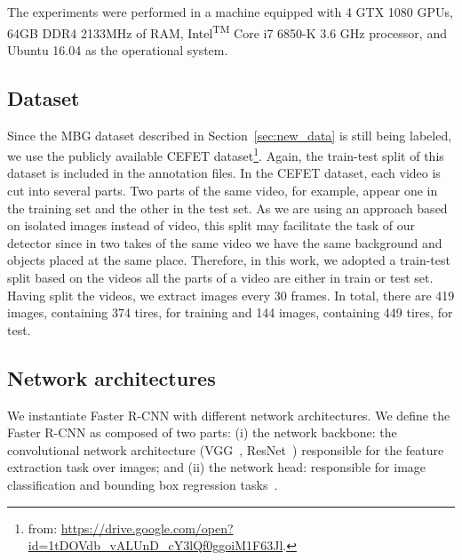 The experiments were performed in a machine equipped with 4 GTX 1080 GPUs, 64GB DDR4 2133MHz of RAM, Intel\textsuperscript{TM} Core i7 6850-K 3.6 GHz processor, and Ubuntu 16.04 as the operational system.


\subsection{Dataset}
%
Since the MBG dataset described in Section~\ref{sec:new_data} is still being labeled, we use the publicly available CEFET dataset\footnote{from: \url{https://drive.google.com/open?id=1tDOVdb_vALUnD_cY3lQf0ggoiM1F63Jl}.}.
Again, the train-test split of this dataset is included in the annotation files.
In the CEFET dataset, each video is cut into several parts.
Two parts of the same video, for example, appear one in the training set and the other in the test set.
As we are using an approach based on isolated images instead of video, this split may facilitate the task of our detector since in two takes of the same video we have the same background and objects placed at the same place.
%
Therefore, in this work, we adopted a train-test split based on the videos \ie all the parts of a video are either in train or test set.
Having split the videos, we extract images every 30 frames.
In total, there are 419 images, containing 374 tires,  for training and 144 images, containing 449 tires,  for test.



%
\subsection{Network architectures}
We instantiate Faster R-CNN with different network architectures.
We define the Faster R-CNN as composed of two parts:
(i) the network backbone: the convolutional network architecture (\eg VGG~\cite{Simonyan2015VGG}, ResNet~\cite{He2016deep}) responsible for the feature extraction task over images; and
(ii) the network head: responsible for image classification and bounding box regression tasks~\cite{He2017mask}.

